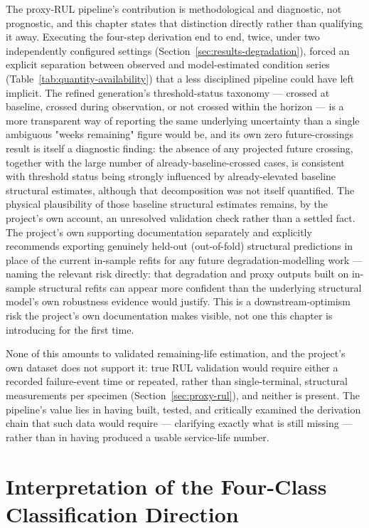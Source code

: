 The proxy-RUL pipeline's contribution is methodological and diagnostic,
not prognostic, and this chapter states that distinction directly rather
than qualifying it away. Executing the four-step derivation end to end,
twice, under two independently configured settings
(Section~\ref{sec:results-degradation}), forced an explicit separation
between observed and model-estimated condition series
(Table~\ref{tab:quantity-availability}) that a less disciplined pipeline
could have left implicit. The refined generation's threshold-status
taxonomy — crossed at baseline, crossed during observation, or not crossed
within the horizon — is a more transparent way of reporting the same
underlying uncertainty than a single ambiguous "weeks remaining" figure
would be, and its own zero future-crossings result is itself a diagnostic
finding: the absence of any projected future crossing, together with the
large number of already-baseline-crossed cases, is consistent with
threshold status being strongly influenced by already-elevated baseline
structural estimates, although that decomposition was not itself
quantified. The physical plausibility of those baseline structural
estimates remains, by the project's own account, an unresolved validation
check rather than a settled fact. The project's own supporting
documentation separately and explicitly recommends exporting genuinely
held-out (out-of-fold) structural predictions in place of the current
in-sample refits for any future degradation-modelling work — naming the
relevant risk directly: that degradation and proxy outputs built on
in-sample structural refits can appear more confident than the underlying
structural model's own robustness evidence would justify. This is a
downstream-optimism risk the project's own documentation makes visible,
not one this chapter is introducing for the first time.

None of this amounts to validated remaining-life estimation, and the
project's own dataset does not support it: true RUL validation would
require either a recorded failure-event time or repeated, rather than
single-terminal, structural measurements per specimen
(Section~\ref{sec:proxy-rul}), and neither is present. The pipeline's
value lies in having built, tested, and critically examined the
derivation chain that such data would require — clarifying exactly what
is still missing — rather than in having produced a usable service-life
number.

\section{Interpretation of the Four-Class Classification Direction}
\label{sec:interp-classification}

